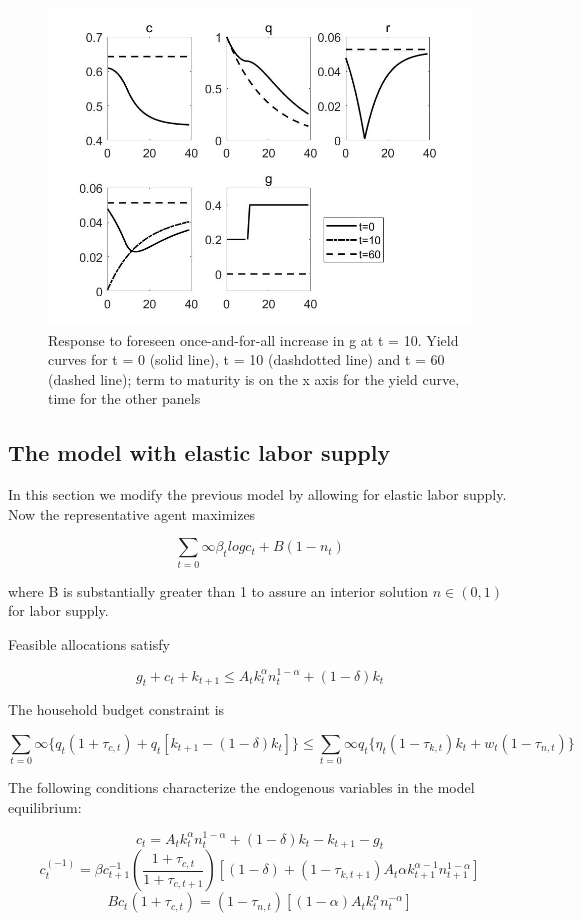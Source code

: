 \documentclass[a4paper,12pt]{scrartcl} %
\begin{document}
\begin{figure}[htbp!]
		\centering
			\includegraphics[width=0.8\linewidth]{fig17.jpg}
            \caption{Response to foreseen once-and-for-all increase in g at t = 10. Yield curves for t = 0 (solid line), t = 10
(dashdotted line) and t = 60 (dashed line); term to maturity is on the x axis for the yield curve, time for the other
panels}\label{17}
\end{figure}

\subsection{The model with elastic labor supply}

In this section we modify the previous model by allowing for elastic labor supply. Now the representative agent maximizes

$$\sum_{t=0}{\infty}\beta_tlogc_t+B(1-n_t)$$

where B is substantially greater than 1 to assure an interior solution $n \in (0,1)$ for labor supply.

Feasible allocations satisfy

$$g_t+c_t+k_{t+1}\le A_tk_t^{\alpha}n_t^{1-\alpha}+(1-\delta)k_t$$

The household budget constraint is

$$\sum_{t=0}{\infty}\{q_t(1+\tau_{c,t})+q_t[k_{t+1}-(1-\delta)k_t]\}\le\sum_{t=0}{\infty}q_t\{\eta_t(1-\tau_{k,t})k_t+w_t(1-\tau_{n,t})\}$$

The following conditions characterize the endogenous variables in the model equilibrium:

\begin{equation}\label{22}
    c_t=A_tk_t^{\alpha}n_t^{1-\alpha}+(1-\delta)k_t-k_{t+1}-g_t
\end{equation}
\begin{equation}\label{23}
    c_t^(-1)=\beta c_{t+1}^{-1}(\frac{1+\tau_{c,t}}{1+\tau_{c,t+1}})[(1-\delta)+(1-\tau_{k,t+1})A_t\alpha k_{t+1}^{\alpha-1}n_{t+1}^{1-\alpha}]
\end{equation}
\begin{equation}\label{24}
    Bc_t(1+\tau_{c,t})=(1-\tau_{n,t})[(1-\alpha)A_tk_t^{\alpha}n_t^{-\alpha}]
\end{equation}
\end{document}
